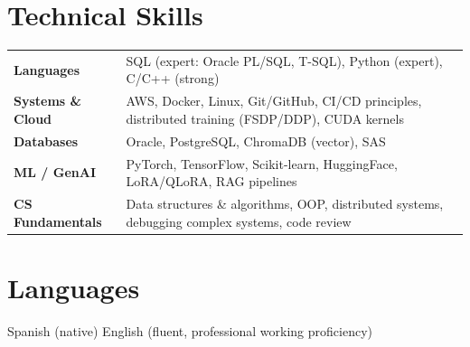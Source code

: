 \documentclass[10pt,a4paper]{article}
\begin{document}
\section{Technical Skills}

\renewcommand{\arraystretch}{1.25}
\begin{tabularx}{\linewidth}{@{} l X @{}}
  \textbf{Languages}        & SQL (expert: Oracle PL/SQL, T-SQL), Python (expert), C/C++ (strong) \\
  \textbf{Systems \& Cloud} & AWS, Docker, Linux, Git/GitHub, CI/CD principles, distributed training (FSDP/DDP), CUDA kernels \\
  \textbf{Databases}        & Oracle, PostgreSQL, ChromaDB (vector), SAS \\
  \textbf{ML / GenAI}       & PyTorch, TensorFlow, Scikit-learn, HuggingFace, LoRA/QLoRA, RAG pipelines \\
  \textbf{CS Fundamentals}  & Data structures \& algorithms, OOP, distributed systems, debugging complex systems, code review \\
\end{tabularx}

\section{Languages}
Spanish (native) \quad English (fluent, professional working proficiency)
\end{document}
